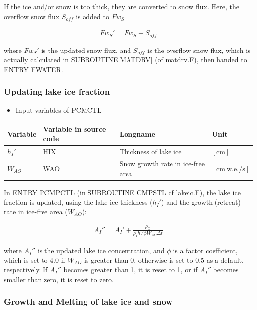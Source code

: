 If the ice and/or snow is too thick, they are converted to snow flux. Here, the overflow snow flux \(S_{off}\) is added to \({Fw_S}\)

\begin{eqnarray}
    Fw_S' = Fw_S + S_{off}
\end{eqnarray}

where \(Fw_S'\) is the updated snow flux, and \(S_{off}\) is the overflow snow flux, which is actually calculated in SUBROUTINE{[}MATDRV{]} (of matdrv.F), then handed to ENTRY FWATER.

\hypertarget{updating-lake-ice-fraction}{%
\subsubsection{Updating lake ice fraction}\label{updating-lake-ice-fraction}}

\begin{itemize}
\tightlist
\item
  Input variables of PCMCTL
\end{itemize}

\begin{longtable}[]{@{}llll@{}}
\toprule
Variable & Variable in source code & Longname & Unit \\
\midrule
\endhead
\(h_I'\) & HIX & Thickness of lake ice & \(\mathrm{[cm]}\) \\
\(W_{AO}\) & WAO & Snow growth rate in ice-free area & \(\mathrm{[cm\ w.e./s]}\) \\
\bottomrule
\end{longtable}

In ENTRY PCMPCTL (in SUBROUTINE CMPSTL of lakeic.F), the lake ice fraction is updated, using the lake ice thickness (\(h_I'\)) and the growth (retreat) rate in ice-free area (\(W_{AO}\)):

\begin{eqnarray}
    A_I'' = {A_I'} +\frac{\rho_O }{\rho_I h_I' \phi W_{AO}\Delta t}
\end{eqnarray}

where \(A_I''\) is the updated lake ice concentration, and \(\phi\) is a factor coefficient, which is set to \(4.0\) if \(W_{AO}\) is greater than 0, otherwise is set to \(0.5\) as a default,
respectively. If \(A_I''\) becomes greater than 1, it is reset to 1, or if \(A_I''\) becomes smaller than zero, it is reset to zero.

\hypertarget{growth-and-melting-of-lake-ice-and-snow}{%
\subsubsection{Growth and Melting of lake ice and snow}\label{growth-and-melting-of-lake-ice-and-snow}}

